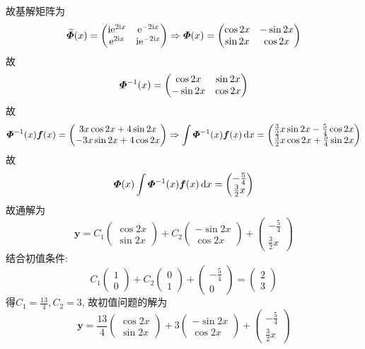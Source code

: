 \begin{solve}
故基解矩阵为
\[\widetilde{\bm{\varPhi}}(x)=\begin{pmatrix}\mathrm{i}\mathrm{e}^{2\mathrm{i} x}&\mathrm{e}^{-2\mathrm{i} x}\\\mathrm{e}^{2\mathrm{i} x}&\mathrm{i}\mathrm{e}^{-2\mathrm{i} x}\end{pmatrix}\Rightarrow\bm{\varPhi}(x)=\begin{pmatrix}\cos2x&-\sin2x\\\sin2x&\cos2x\end{pmatrix}\]
故
\[\bm{\varPhi}^{-1}(x)=\begin{pmatrix}\cos2x&\sin2x\\-\sin2x&\cos2x\end{pmatrix}\]
故
\[\bm{\varPhi}^{-1}(x)\bm{f}(x)=\begin{pmatrix}3x\cos2x+4\sin2x\\-3x\sin2x+4\cos2x\end{pmatrix}\Rightarrow\int\bm{\varPhi}^{-1}(x)\bm{f}(x)\,\mathrm{d} x=\begin{pmatrix}\frac{3}{2}x\sin2x-\frac{5}{4}\cos2x\\\frac{3}{2}x\cos2x+\frac{5}{4}\sin2x\end{pmatrix}\]
故
\[\bm{\varPhi}(x)\int\bm{\varPhi}^{-1}(x)\bm{f}(x)\,\mathrm{d} x=\begin{pmatrix}-\frac{5}{4}\\\frac{3}{2}x\end{pmatrix}\]
故通解为
\[\bm{y}=C_1\begin{pmatrix}\cos2x\\\sin2x\end{pmatrix}+C_2\begin{pmatrix}-\sin2x\\\cos2x\end{pmatrix}+\begin{pmatrix}-\frac{5}{4}\\\frac{3}{2}x\end{pmatrix}\]
结合初值条件:
\[C_1\begin{pmatrix}1\\0\end{pmatrix}+C_2\begin{pmatrix}0\\1\end{pmatrix}+\begin{pmatrix}-\frac{5}{4}\\0\end{pmatrix}=\begin{pmatrix}2\\3\end{pmatrix}\]
得$C_1=\frac{13}{4},C_2=3$, 故初值问题的解为
\[\bm{y}=\frac{13}{4}\begin{pmatrix}\cos2x\\\sin2x\end{pmatrix}+3\begin{pmatrix}-\sin2x\\\cos2x\end{pmatrix}+\begin{pmatrix}-\frac{5}{4}\\\frac{3}{2}x\end{pmatrix}\]


\end{solve}
